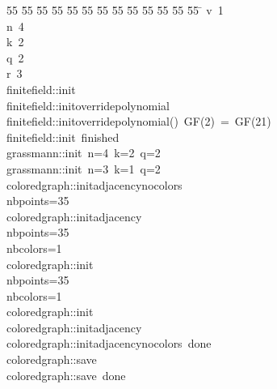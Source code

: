 %
%
\begin{tabbing}
55 \= 55 \= 55 \= 55 \= 55 \= 55 \= 55 \= 55 \= 55 \= 55 \= 55 \= 55 \= 55 \= \kill
{}v\ 1\\[0pt]
n\ 4\\[0pt]
k\ 2\\[0pt]
q\ 2\\[0pt]
r\ 3\\[0pt]
finitefield::init\\[0pt]
finitefield::initoverridepolynomial\\[0pt]
finitefield::initoverridepolynomial()\ GF(2)\ =\ GF(21)\\[0pt]
finitefield::init\ finished\\[0pt]
grassmann::init\ n=4\ k=2\ q=2\\[0pt]
grassmann::init\ n=3\ k=1\ q=2\\[0pt]
coloredgraph::initadjacencynocolors\\[0pt]
nbpoints=35\\[0pt]
coloredgraph::initadjacency\\[0pt]
nbpoints=35\\[0pt]
nbcolors=1\\[0pt]
coloredgraph::init\\[0pt]
nbpoints=35\\[0pt]
nbcolors=1\\[0pt]
coloredgraph::init\\[0pt]
coloredgraph::initadjacency\\[0pt]
coloredgraph::initadjacencynocolors\ done\\[0pt]
coloredgraph::save\\[0pt]
coloredgraph::save\ done\\[0pt]
\end{tabbing}

